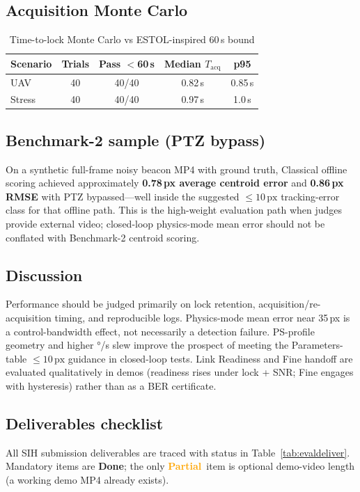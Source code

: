 \documentclass[11pt,a4paper]{article}
\newcommand{\Done}{\textcolor{DoneGreen}{\textbf{Done}}}
\newcommand{\Partial}{\textcolor{orange}{\textbf{Partial}}}
\begin{document}
\subsection{Acquisition Monte Carlo}
\begin{table}[H]
\centering
\caption{Time-to-lock Monte Carlo vs ESTOL-inspired 60\,s bound}
\label{tab:mc}
\begin{tabular}{@{}lcccc@{}}
\toprule
Scenario & Trials & Pass $<$60\,s & Median $T_{\mathrm{acq}}$ & p95 \\
\midrule
UAV & 40 & 40/40 & 0.82\,s & 0.85\,s \\
Stress & 40 & 40/40 & 0.97\,s & 1.0\,s \\
\bottomrule
\end{tabular}
\end{table}

\subsection{Benchmark-2 sample (PTZ bypass)}
On a synthetic full-frame noisy beacon MP4 with ground truth, Classical offline scoring achieved approximately \textbf{0.78\,px average centroid error} and \textbf{0.86\,px RMSE} with PTZ bypassed---well inside the suggested $\le10\,\mathrm{px}$ tracking-error class for that offline path.
This is the high-weight evaluation path when judges provide external video; closed-loop physics-mode mean error should not be conflated with Benchmark-2 centroid scoring.

\subsection{Discussion}
Performance should be judged primarily on lock retention, acquisition/re-acquisition timing, and reproducible logs.
Physics-mode mean error near 35\,px is a control-bandwidth effect, not necessarily a detection failure.
PS-profile geometry and higher °/s slew improve the prospect of meeting the Parameters-table $\le10\,\mathrm{px}$ guidance in closed-loop tests.
Link Readiness and Fine handoff are evaluated qualitatively in demos (readiness rises under lock + SNR; Fine engages with hysteresis) rather than as a BER certificate.

\subsection{Deliverables checklist}
All SIH submission deliverables are traced with status in Table~\ref{tab:evaldeliver}.
Mandatory items are \Done; the only \Partial\ item is optional demo-video length (a working demo MP4 already exists).
\end{document}
